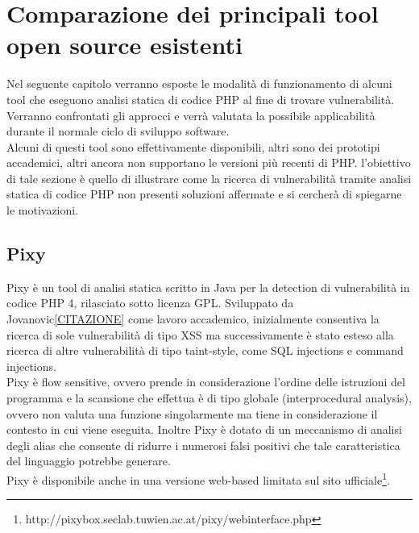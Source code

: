 \chapter{Comparazione dei principali tool open source esistenti}

\begin{epigraphs}
\end{epigraphs}

Nel seguente capitolo verranno esposte le modalità di funzionamento di alcuni tool che eseguono analisi statica di codice PHP al fine di trovare vulnerabilità. Verranno confrontati gli approcci e verrà valutata la possibile applicabilità durante il normale ciclo di sviluppo software. \\
Alcuni di questi tool sono effettivamente disponibili, altri sono dei prototipi accademici, altri ancora non supportano le versioni più recenti di PHP. l'obiettivo di tale sezione è quello di illustrare come la ricerca di vulnerabilità tramite analisi statica di codice PHP non presenti soluzioni affermate e si cercherà di spiegarne le motivazioni.

\section{Pixy}
Pixy è un tool di analisi statica scritto in Java per la detection di vulnerabilità in codice PHP 4, rilasciato sotto licenza GPL. Sviluppato da Jovanovic\ref{CITAZIONE} come lavoro accademico, inizialmente consentiva la ricerca di sole vulnerabilità di tipo XSS ma successivamente è stato esteso alla ricerca di altre vulnerabilità di tipo taint-style, come SQL injections e command injections.\\
Pixy è flow sensitive, ovvero prende in considerazione l'ordine delle istruzioni del programma e la scansione che effettua è di tipo globale (interprocedural analysis), ovvero non valuta una funzione singolarmente ma tiene in considerazione il contesto in cui viene eseguita. Inoltre Pixy è dotato di un meccanismo di analisi degli alias che consente di ridurre i numerosi falsi positivi che tale caratteristica del linguaggio potrebbe generare.\\
Pixy è disponibile anche in una versione web-based limitata sul sito ufficiale\footnote{http://pixybox.seclab.tuwien.ac.at/pixy/webinterface.php}.

